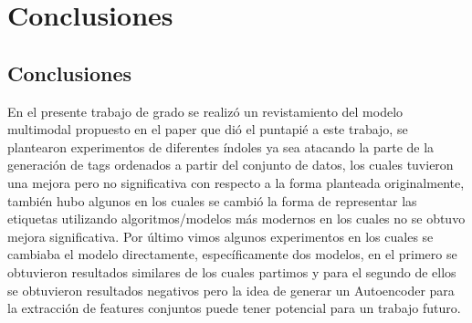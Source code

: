 \chapter{Conclusiones} \label{chapter:chapter5}

\section{Conclusiones}
En el presente trabajo de grado se realizó un revistamiento del modelo multimodal propuesto en el paper que dió el puntapié a este trabajo, se plantearon experimentos de diferentes índoles ya sea atacando la parte de la generación de tags ordenados a partir del conjunto de datos, los cuales tuvieron una mejora pero no significativa con respecto a la forma planteada originalmente, también hubo algunos en los cuales se cambió la forma de representar las etiquetas utilizando algoritmos/modelos más modernos en los cuales no se obtuvo mejora significativa. Por último vimos algunos experimentos en los cuales se cambiaba el modelo directamente, específicamente dos modelos, en el primero se obtuvieron resultados similares de los cuales partimos y para el segundo de ellos se obtuvieron resultados negativos pero la idea de generar un Autoencoder para la extracción de features conjuntos puede tener potencial para un trabajo futuro.